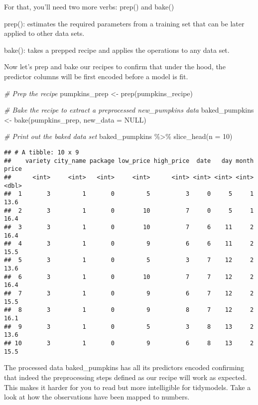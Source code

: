 \documentclass[
]{article}
\newenvironment{Shaded}{\begin{snugshade}}{\end{snugshade}}
\newcommand{\AttributeTok}[1]{\textcolor[rgb]{0.77,0.63,0.00}{#1}}
\newcommand{\CommentTok}[1]{\textcolor[rgb]{0.56,0.35,0.01}{\textit{#1}}}
\newcommand{\ConstantTok}[1]{\textcolor[rgb]{0.00,0.00,0.00}{#1}}
\newcommand{\DecValTok}[1]{\textcolor[rgb]{0.00,0.00,0.81}{#1}}
\newcommand{\FunctionTok}[1]{\textcolor[rgb]{0.00,0.00,0.00}{#1}}
\newcommand{\NormalTok}[1]{#1}
\newcommand{\OtherTok}[1]{\textcolor[rgb]{0.56,0.35,0.01}{#1}}
\newcommand{\SpecialCharTok}[1]{\textcolor[rgb]{0.00,0.00,0.00}{#1}}
\begin{document}
For that, you'll need two more verbs: prep() and bake()

prep(): estimates the required parameters from a training set that can
be later applied to other data sets.

bake(): takes a prepped recipe and applies the operations to any data
set.

Now let's prep and bake our recipes to confirm that under the hood, the
predictor columns will be first encoded before a model is fit.

\begin{Shaded}
\begin{Highlighting}[]
\CommentTok{\# Prep the recipe}
\NormalTok{pumpkins\_prep }\OtherTok{\textless{}{-}} \FunctionTok{prep}\NormalTok{(pumpkins\_recipe)}

\CommentTok{\# Bake the recipe to extract a preprocessed new\_pumpkins data}
\NormalTok{baked\_pumpkins }\OtherTok{\textless{}{-}} \FunctionTok{bake}\NormalTok{(pumpkins\_prep, }\AttributeTok{new\_data =} \ConstantTok{NULL}\NormalTok{)}

\CommentTok{\# Print out the baked data set}
\NormalTok{baked\_pumpkins }\SpecialCharTok{\%\textgreater{}\%} 
  \FunctionTok{slice\_head}\NormalTok{(}\AttributeTok{n =} \DecValTok{10}\NormalTok{)}
\end{Highlighting}
\end{Shaded}

\begin{verbatim}
## # A tibble: 10 x 9
##    variety city_name package low_price high_price  date   day month price
##      <int>     <int>   <int>     <int>      <int> <int> <int> <int> <dbl>
##  1       3         1       0         5          3     0     5     1  13.6
##  2       3         1       0        10          7     0     5     1  16.4
##  3       3         1       0        10          7     6    11     2  16.4
##  4       3         1       0         9          6     6    11     2  15.5
##  5       3         1       0         5          3     7    12     2  13.6
##  6       3         1       0        10          7     7    12     2  16.4
##  7       3         1       0         9          6     7    12     2  15.5
##  8       3         1       0         9          8     7    12     2  16.1
##  9       3         1       0         5          3     8    13     2  13.6
## 10       3         1       0         9          6     8    13     2  15.5
\end{verbatim}

The processed data baked\_pumpkins has all its predictors encoded
confirming that indeed the preprocessing steps defined as our recipe
will work as expected. This makes it harder for you to read but more
intelligible for tidymodels. Take a look at how the observations have
been mapped to numbers.
\end{document}
